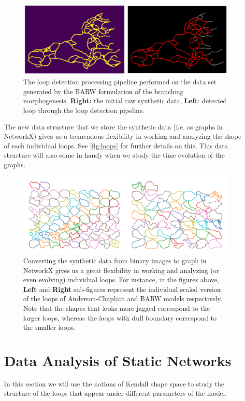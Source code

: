 \documentclass[10pt,a4paper,twocolumn]{article}
\begin{document}
	\begin{figure}[h!]
		\centering
		\includegraphics[width=1\linewidth]{images/BARWProc}
		\caption{The loop detection processing pipeline performed on the data set generated by the BARW formulation of the branching morphogenesis. \textbf{Right:} the initial raw synthetic data, \textbf{Left}: detected loop through the loop detection pipeline.}
		\label{fig:barwproc}
	\end{figure}
	
	The new data structure that we store the synthetic data (i.e. as graphs in NetworkX) gives us a tremendous flexibility in working and analyzing the shape of each individual loops. See \autoref{fig:loops} for further details on this. This data structure will also come in handy when we study the time evolution of the graphs.
	\begin{figure}[h!]
		\centering
		\includegraphics[width=1\linewidth]{images/loops.png}
		\caption{Converting the synthetic data from binary images to graph in NetworkX gives us a great flexibility in working and analyzing (or even evolving) individual loops. For instance, in the figures above, \textbf{Left} and \textbf{Right} sub-figures represent the individual scaled version of the loops of Anderson-Chaplain and BARW models respectively. Note that the shapes that looks more jagged correspond to the larger loops, whereas the loops with dull boundary correspond to the smaller loops.}
		\label{fig:loops}
	\end{figure}
	\section{Data Analysis of Static Networks}
	In this section we will use the notions of Kendall shape space to study the structure of the loops that appear under different parameters of the model. 
	
\end{document}
